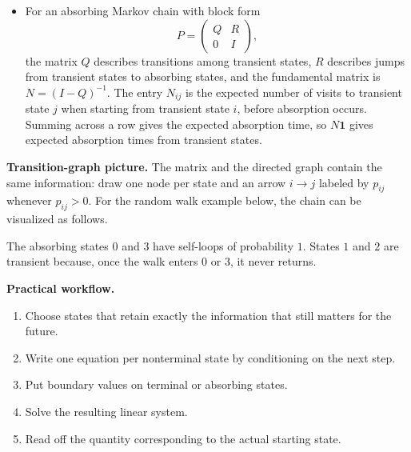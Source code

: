 \documentclass[11pt]{article}
\theoremstyle{definition}
\begin{document}
\begin{itemize}
    \item For an absorbing Markov chain with block form
    \[
        P=\begin{pmatrix}Q&R\\0&I\end{pmatrix},
    \]
    the matrix $Q$ describes transitions among transient states, $R$ describes jumps from transient states to absorbing states, and the fundamental matrix is $N=(I-Q)^{-1}$. The entry $N_{ij}$ is the expected number of visits to transient state $j$ when starting from transient state $i$, before absorption occurs. Summing across a row gives the expected absorption time, so $N\mathbf{1}$ gives expected absorption times from transient states.
\end{itemize}

\textbf{Transition-graph picture.} The matrix and the directed graph contain the same information: draw one node per state and an arrow $i\to j$ labeled by $p_{ij}$ whenever $p_{ij}>0$. For the random walk example below, the chain can be visualized as follows.

\begin{center}
\end{center}

The absorbing states $0$ and $3$ have self-loops of probability $1$. States $1$ and $2$ are transient because, once the walk enters $0$ or $3$, it never returns.

\textbf{Practical workflow.}
\begin{enumerate}
    \item Choose states that retain exactly the information that still matters for the future.
    \item Write one equation per nonterminal state by conditioning on the next step.
    \item Put boundary values on terminal or absorbing states.
    \item Solve the resulting linear system.
    \item Read off the quantity corresponding to the actual starting state.
\end{enumerate}
\end{document}
